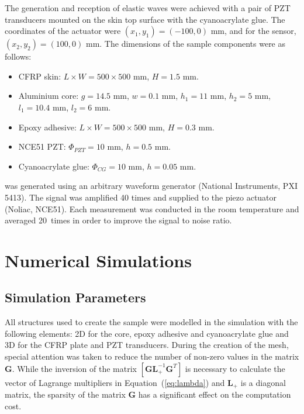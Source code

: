 \documentclass[sensors,article,accept,moreauthors,pdftex]{Definitions/mdpi}
\begin{document}
\begin{paracol}{2}
The generation and reception of elastic waves were achieved with a pair of PZT transducers mounted on the skin top surface with the cyanoacrylate glue.
The coordinates of the actuator were \((x_1,y_1)=(-100,0)\) mm,	and for the sensor, \((x_2,y_2)=(100,0)\) mm.
The dimensions of the sample components were as follows:
\begin{itemize}
	\item CFRP skin: \(L \times W = 500 \times 500\) mm, \(H = 1.5\) mm.
	\item Aluminium core: \(g=14.5\) mm, \(w=0.1\) mm, \(h_1=11\) mm, \(h_2=5\) mm, \(l_1=10.4\) mm, \(l_2=6\) mm.
	\item Epoxy adhesive: \(L\times W=500 \times 500\) mm, \(H=0.3 \) mm.
	\item NCE51 PZT: \(\Phi_{PZT}=10\) mm, \(h=0.5\) mm.
	\item Cyanoacrylate glue: \(\Phi_{CG}=10\) mm, \(h=0.05\) mm.
\end{itemize}

 was generated using an arbitrary waveform generator (National Instruments, PXI 5413).
The signal was amplified 40 times and supplied to the piezo actuator (Noliac, NCE51).
Each measurement was conducted in the room temperature and averaged 20~times in order to improve the signal to noise ratio.


\section{Numerical Simulations}
\label{sec:numerical}
\subsection{Simulation Parameters}
\label{sec:simulation}
All structures used to create the sample were modelled in the simulation with the following elements: 2D for the core, epoxy adhesive and cyanoacrylate glue and 3D for the CFRP plate and PZT transducers.
During the creation of the mesh, special attention was taken to reduce the number of non-zero values in the matrix \(\textbf{G}\). While the inversion of the matrix \(\left [\textbf{GL}_+^{-1}\textbf{G}^T\right ]\) is necessary to calculate the vector of Lagrange multipliers in \mbox{Equation~(\ref{eq:lambda})} and \(\textbf{L}_+\) is a diagonal matrix, the sparsity of the matrix \(\textbf{G}\) has a significant effect on the computation cost.



\end{paracol}
\end{document}
